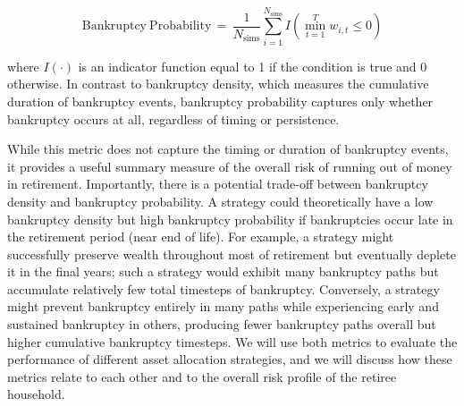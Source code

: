 \documentclass[11pt]{article}
\begin{document}
\begin{equation}\label{eq:bankruptcy_probability}
\mathrm{Bankruptcy\ Probability} \,=\, \frac{1}{N_{\mathrm{sims}}} \sum_{i=1}^{N_{\mathrm{sims}}} I\left(\min_{t=1}^{T} w_{i,t} \leq 0\right)
\end{equation}

where $I(\cdot)$ is an indicator function equal to 1 if the condition is true and 0 otherwise. In contrast to bankruptcy density, which measures the cumulative duration of bankruptcy events, bankruptcy probability captures only whether bankruptcy occurs at all, regardless of timing or persistence.

While this metric does not capture the timing or duration of bankruptcy events, it provides a useful summary measure of the overall risk of running out of money in retirement. Importantly, there is a potential trade-off between bankruptcy density and bankruptcy probability. A strategy could theoretically have a low bankruptcy density but high bankruptcy probability if bankruptcies occur late in the retirement period (near end of life). For example, a strategy might successfully preserve wealth throughout most of retirement but eventually deplete it in the final years; such a strategy would exhibit many bankruptcy paths but accumulate relatively few total timesteps of bankruptcy. Conversely, a strategy might prevent bankruptcy entirely in many paths while experiencing early and sustained bankruptcy in others, producing fewer bankruptcy paths overall but higher cumulative bankruptcy timesteps. We will use both metrics to evaluate the performance of different asset allocation strategies, and we will discuss how these metrics relate to each other and to the overall risk profile of the retiree household.
\end{document}
